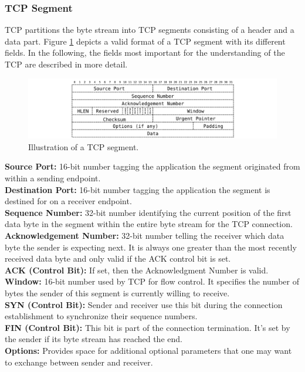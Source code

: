 \subsubsection{TCP Segment}

TCP partitions the byte stream into TCP segments consisting of a header and a data part. Figure \ref{fig:TCPSegment} depicts a valid format of a TCP segment with its different fields. In the following, the fields most important for the understanding of the TCP are described in more detail. 

\begin{figure} [H]
	\begin{center}
		\def\svgwidth{1\textwidth}
		\includegraphics[scale=0.2]{../illustrations/importantConcepts/TCPSegment.pdf}  
		\caption[Caption for the list of figures.]{Illustration of a TCP segment.}
		\label{fig:TCPSegment}
	\end{center}
\end{figure}

{\small \textbf{Source Port:} 16-bit number tagging the application the segment originated from within a sending endpoint. \smallskip\\
\textbf{Destination Port:} 16-bit number tagging the application the segment is destined for on a receiver endpoint. \smallskip\\
\textbf{Sequence Number:} 32-bit number identifying the current position of the first data byte in the segment within the entire byte stream for the TCP connection. \smallskip\\
\textbf{Acknowledgement Number:} 32-bit number telling the receiver which data byte the sender is expecting next. It is always one greater than the most recently received data byte and only valid if the ACK control bit is set. \smallskip\\
\textbf{ACK (Control Bit):} If set, then the Acknowledgment Number is valid. \smallskip\\
\textbf{Window:} 16-bit number used by TCP for flow control. It specifies the number of bytes the sender of this segment is currently willing to receive. \smallskip\\
\textbf{SYN (Control Bit):} Sender and receiver use this bit during the connection establishment to synchronize their sequence numbers.  \smallskip\\
\textbf{FIN (Control Bit):} This bit is part of the connection termination. It's set by the sender if its byte stream has reached the end. \smallskip\\
\textbf{Options:} Provides space for additional optional parameters that one may want to exchange between sender and receiver. 
}
 
